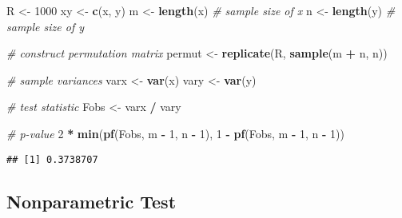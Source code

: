 \documentclass[
]{book}
\newenvironment{Shaded}{\begin{snugshade}}{\end{snugshade}}
\newcommand{\CommentTok}[1]{\textcolor[rgb]{0.56,0.35,0.01}{\textit{#1}}}
\newcommand{\DecValTok}[1]{\textcolor[rgb]{0.00,0.00,0.81}{#1}}
\newcommand{\KeywordTok}[1]{\textcolor[rgb]{0.13,0.29,0.53}{\textbf{#1}}}
\newcommand{\NormalTok}[1]{#1}
\newcommand{\OperatorTok}[1]{\textcolor[rgb]{0.81,0.36,0.00}{\textbf{#1}}}
\newcommand{\StringTok}[1]{\textcolor[rgb]{0.31,0.60,0.02}{#1}}
\begin{document}
\begin{Shaded}
\begin{Highlighting}[]
\NormalTok{R <-}\StringTok{ }\DecValTok{1000}
\NormalTok{xy <-}\StringTok{ }\KeywordTok{c}\NormalTok{(x, y)}
\NormalTok{m <-}\StringTok{ }\KeywordTok{length}\NormalTok{(x) }\CommentTok{# sample size of x}
\NormalTok{n <-}\StringTok{ }\KeywordTok{length}\NormalTok{(y) }\CommentTok{# sample size of y}

\CommentTok{# construct permutation matrix}
\NormalTok{permut <-}\StringTok{ }\KeywordTok{replicate}\NormalTok{(R, }\KeywordTok{sample}\NormalTok{(m }\OperatorTok{+}\StringTok{ }\NormalTok{n, n))}

\CommentTok{# sample variances}
\NormalTok{varx <-}\StringTok{ }\KeywordTok{var}\NormalTok{(x)}
\NormalTok{vary <-}\StringTok{ }\KeywordTok{var}\NormalTok{(y)}

\CommentTok{# test statistic}
\NormalTok{Fobs <-}\StringTok{ }\NormalTok{varx }\OperatorTok{/}\StringTok{ }\NormalTok{vary}

\CommentTok{# p-value}
\DecValTok{2} \OperatorTok{*}\StringTok{ }\KeywordTok{min}\NormalTok{(}\KeywordTok{pf}\NormalTok{(Fobs, m }\OperatorTok{-}\StringTok{ }\DecValTok{1}\NormalTok{, n }\OperatorTok{-}\StringTok{ }\DecValTok{1}\NormalTok{), }\DecValTok{1} \OperatorTok{-}\StringTok{ }\KeywordTok{pf}\NormalTok{(Fobs, m }\OperatorTok{-}\StringTok{ }\DecValTok{1}\NormalTok{, n }\OperatorTok{-}\StringTok{ }\DecValTok{1}\NormalTok{))}
\end{Highlighting}
\end{Shaded}

\begin{verbatim}
## [1] 0.3738707
\end{verbatim}

\hypertarget{nonparametric-test}{%
\subsection{Nonparametric Test}\label{nonparametric-test}}
\end{document}
